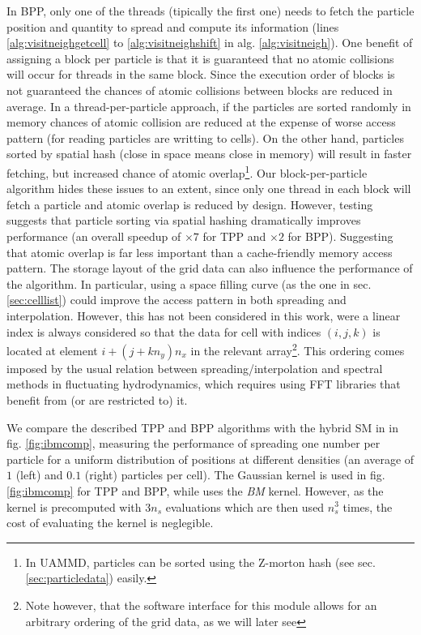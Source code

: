 \documentclass[ twoside,openright,titlepage,numbers=noenddot,%
headinclude,footinclude,cleardoublepage=empty,abstract=on,
BCOR=5mm,paper=a4,fontsize=11pt, dvipsnames
]{scrreprt}
\newcommand{\uammd}{\gls{UAMMD}\xspace}
\begin{document}
In BPP, only one of the threads (tipically the first one) needs to fetch the particle position and quantity to spread and compute its information (lines \ref{alg:visitneighgetcell} to \ref{alg:visitneighshift} in alg. \ref{alg:visitneigh}).
One benefit of assigning a block per particle is that it is guaranteed that no atomic collisions will occur for threads in the same block. Since the execution order of blocks is not guaranteed the chances of atomic collisions between blocks are reduced in average.
In a thread-per-particle approach, if the particles are sorted randomly in memory chances of atomic collision are reduced at the expense of worse access pattern (for reading particles are writting to cells). On the other hand, particles sorted by spatial hash (close in space means close in memory) will result in faster fetching, but increased chance of atomic overlap\footnote{In \uammd, particles can be sorted using the Z-morton hash (see sec. \ref{sec:particledata}) easily.}.
Our block-per-particle algorithm hides these issues to an extent, since only one thread in each block will fetch a particle and atomic overlap is reduced by design.
However, testing suggests that particle sorting via spatial hashing dramatically improves performance (an overall speedup of $\times 7$ for TPP and $\times 2$ for BPP). Suggesting that atomic overlap is far less important than a cache-friendly memory access pattern.
The storage layout of the grid data can also influence the performance of the algorithm. In particular, using a space filling curve (as the one in sec. \ref{sec:celllist}) could improve the access pattern in both spreading and interpolation\cite{Shih2021}. However, this has not been considered in this work, were a linear index is always considered so that the data for cell with indices $(i,j,k)$ is located at element $i+(j+kn_y)n_x$ in the relevant array\footnote{Note however, that the software interface for this module allows for an arbitrary ordering of the grid data, as we will later see}. This ordering comes imposed by the usual relation between spreading/interpolation and spectral methods in fluctuating hydrodynamics, which requires using \gls{FFT} libraries that benefit from (or are restricted to) it.

We compare the described TPP and BPP algorithms with the hybrid SM in \cite{Shih2021} in fig. \ref{fig:ibmcomp}, measuring the performance of spreading one number per particle for a uniform distribution of positions at different densities (an average of $1$ (left) and $0.1$ (right) particles per cell). The Gaussian kernel is used in fig. \ref{fig:ibmcomp} for TPP and BPP, while \cite{Shih2021} uses the \emph{BM} kernel. However, as the kernel is precomputed with $3n_s$ evaluations which are then used $n_s^3$ times, the cost of evaluating the kernel is neglegible.
\end{document}
